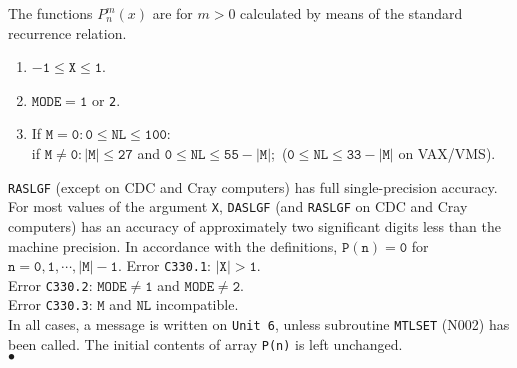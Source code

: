 \Method
The functions $P_n^m(x)$ are for $ m>0 $ calculated by means of
the standard recurrence relation.
\newpage
\Restrict
\begin{enumerate}
\item $\mathtt{-1 \le X \le 1}$.
\item $\mathtt{MODE = 1}$ or {\tt 2}.
\item If $\mathtt{M = 0: 0 \le NL \le 100}$: \\
if $\mathtt{M \ne 0: |M| \le 27}$
and $\mathtt{0 \le NL \le 55 - |M|}$;\,
($\mathtt{0 \le NL \le 33 - |M|}$ on VAX/VMS).
\end{enumerate}
\Accuracy
{\tt RASLGF} (except on CDC and Cray computers)
has full single-precision accuracy.
For most values of the argument {\tt X}, {\tt DASLGF}
(and {\tt RASLGF} on CDC and Cray computers) has an accuracy of
approximately two significant digits less than the machine precision.
\Notes
In accordance with the definitions,
$\mathtt{P(n) = 0}$ for $\mathtt{n = 0,1,\cdots,|M|-1}$.
\Errorh
Error {\tt C330.1}: $\mathtt{|X|>1}$. \\
Error {\tt C330.2}: $\mathtt{MODE \ne 1}$ and $\mathtt{MODE \ne 2}$. \\
Error {\tt C330.3}: $\mathtt{M}$ and $\mathtt{NL}$ incompatible. \\
In all cases, a message is written on
{\tt Unit 6}, unless subroutine {\tt MTLSET} (N002) has been called.
The initial contents of array {\tt P(n)} is left unchanged.
\\ $\bullet$
